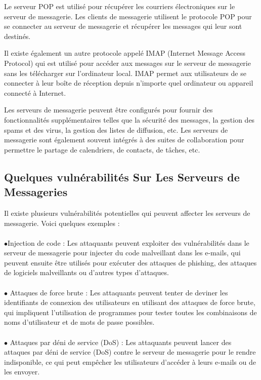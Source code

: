 Le serveur POP est utilisé pour récupérer les courriers électroniques sur le serveur de messagerie. Les clients de messagerie utilisent le protocole POP pour se connecter au serveur de messagerie et récupérer les messages qui leur sont destinés.

Il existe également un autre protocole appelé IMAP (Internet Message Access Protocol) qui est utilisé pour accéder aux messages sur le serveur de messagerie sans les télécharger sur l'ordinateur local. IMAP permet aux utilisateurs de se connecter à leur boîte de réception depuis n'importe quel ordinateur ou appareil connecté à Internet.

Les serveurs de messagerie peuvent être configurés pour fournir des fonctionnalités supplémentaires telles que la sécurité des messages, la gestion des spams et des virus, la gestion des listes de diffusion, etc. Les serveurs de messagerie sont également souvent intégrés à des suites de collaboration pour permettre le partage de calendriers, de contacts, de tâches, etc.
\subsection{Quelques vulnérabilités Sur Les Serveurs de Messageries }
Il existe plusieurs vulnérabilités potentielles qui peuvent affecter les serveurs de messagerie. Voici quelques exemples :
\paragraph{ }
$\bullet$Injection de code : Les attaquants peuvent exploiter des vulnérabilités dans le serveur de messagerie pour injecter du code malveillant dans les e-mails, qui peuvent ensuite être utilisés pour exécuter des attaques de phishing, des attaques de logiciels malveillants ou d'autres types d'attaques.

\paragraph{ }
$\bullet$ Attaques de force brute : Les attaquants peuvent tenter de deviner les identifiants de connexion des utilisateurs en utilisant des attaques de force brute, qui impliquent l'utilisation de programmes pour tester toutes les combinaisons de noms d'utilisateur et de mots de passe possibles.

\paragraph{ }
$\bullet$ Attaques par déni de service (DoS) : Les attaquants peuvent lancer des attaques par déni de service (DoS) contre le serveur de messagerie pour le rendre indisponible, ce qui peut empêcher les utilisateurs d'accéder à leurs e-mails ou de les envoyer.

